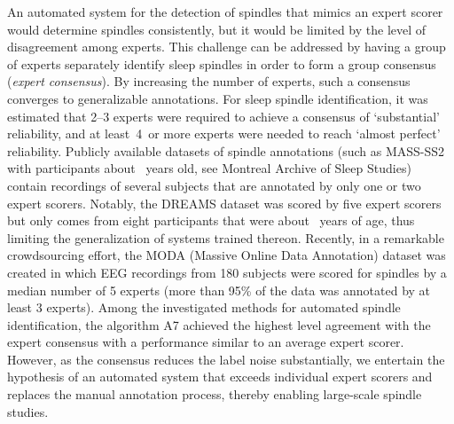 \documentclass[fleqn,twocolumn,10pt]{wlscirep}
\begin{document}
An automated system for the detection of spindles that mimics an expert scorer
would determine spindles consistently, but it would be limited by the level of
disagreement among experts.
This challenge can be addressed
by having a group of experts separately identify sleep spindles in order to form a
group consensus (\emph{expert consensus})\cite{Wendt2015}.  By increasing the
number of experts, such a consensus converges to generalizable
annotations\cite{Kraemer1979}.
For sleep spindle identification, it was estimated that 2--3 experts were
required to achieve a consensus of `substantial' reliability, and at least~4~or
more experts were needed to reach `almost perfect' reliability\cite{Wendt2015}.
Publicly available datasets of spindle annotations (such as MASS-SS2 with 
participants about ~years old, see Montreal Archive of Sleep Studies\cite{OReilly2014}) contain recordings of
several subjects that are annotated by only one or two expert scorers.  Notably, the
DREAMS dataset\cite{Devuyst2006} was scored by five expert scorers but only comes from eight
participants that were about ~years of age\cite{Kulkarni2019}, thus limiting the
generalization of systems trained thereon.
Recently, in a remarkable crowdsourcing effort, the MODA (Massive Online
Data Annotation) dataset was created in which EEG recordings from 180 subjects
were scored for spindles by a median number of 5 experts (more than 95\% of the
data was annotated by at least 3 experts)\cite{Lacourse2020}.
Among the investigated methods for automated spindle identification, the
algorithm A7\cite{Lacourse2019} achieved the highest level agreement with the expert consensus
with a performance similar to an average expert scorer.
However, as the consensus reduces the label noise substantially,
we entertain the hypothesis of an automated system that exceeds individual
expert scorers and replaces the manual annotation process,
thereby enabling large-scale spindle studies.
\end{document}
